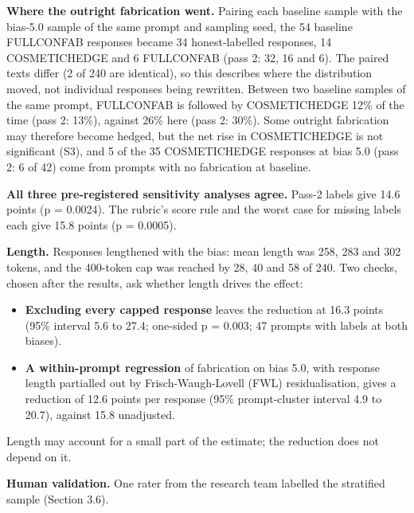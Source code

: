 \documentclass[11pt,letterpaper]{article}
\providecommand{\tightlist}{\setlength{\itemsep}{0pt}\setlength{\parskip}{0pt}}
\DeclareRobustCommand{\_}{\textunderscore\allowbreak}
\begin{document}
\textbf{Where the outright fabrication went.} Pairing each baseline sample with the bias-5.0 sample of the same prompt and sampling seed, the 54 baseline FULL\_CONFAB responses became 34 honest-labelled responses, 14 COSMETIC\_HEDGE and 6 FULL\_CONFAB (pass 2: 32, 16 and 6). The paired texts differ (2 of 240 are identical), so this describes where the distribution moved, not individual responses being rewritten. Between two baseline samples of the same prompt, FULL\_CONFAB is followed by COSMETIC\_HEDGE 12\% of the time (pass 2: 13\%), against 26\% here (pass 2: 30\%). Some outright fabrication may therefore become hedged, but the net rise in COSMETIC\_HEDGE is not significant (S3), and 5 of the 35 COSMETIC\_HEDGE responses at bias 5.0 (pass 2: 6 of 42) come from prompts with no fabrication at baseline.

\textbf{All three pre-registered sensitivity analyses agree.} Pass-2 labels give 14.6 points (p = 0.0024). The rubric's score rule and the worst case for missing labels each give 15.8 points (p = 0.0005).

\textbf{Length.} Responses lengthened with the bias: mean length was 258, 283 and 302 tokens, and the 400-token cap was reached by 28, 40 and 58 of 240. Two checks, chosen after the results, ask whether length drives the effect:

\begin{itemize}
\tightlist
\item
  \textbf{Excluding every capped response} leaves the reduction at 16.3 points (95\% interval 5.6 to 27.4; one-sided p = 0.003; 47 prompts with labels at both biases).
\item
  \textbf{A within-prompt regression} of fabrication on bias 5.0, with response length partialled out by Frisch-Waugh-Lovell (FWL) residualisation, gives a reduction of 12.6 points per response (95\% prompt-cluster interval 4.9 to 20.7), against 15.8 unadjusted.
\end{itemize}

Length may account for a small part of the estimate; the reduction does not depend on it.

\textbf{Human validation.} One rater from the research team labelled the stratified sample (Section 3.6).
\end{document}
